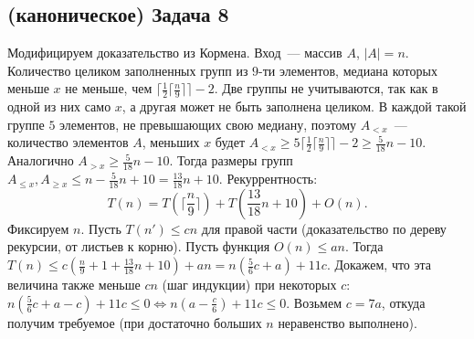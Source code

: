 \documentclass[a4paper]{article}
\begin{document}
\subsection*{(каноническое) Задача 8}
Модифицируем доказательство из Кормена. Вход~--- массив $A$, $|A|=n$. Количество целиком заполненных групп из $9$-ти элементов, медиана которых меньше $x$ не меньше, чем $\lceil \frac{1}{2}\lceil \frac{n}{9}\rceil\rceil-2$. Две группы не учитываются, так как в одной из них само $x$, а другая может не быть заполнена целиком. В каждой такой группе $5$ элементов, не превышающих свою медиану, поэтому $A_{<x}$~--- количество элементов $A$, меньших $x$ будет $A_{<x}\geqslant 5\lceil \frac{1}{2}\lceil \frac{n}{9}\rceil\rceil-2\geqslant\frac{5}{18}n-10$. Аналогично $A_{>x}\geqslant \frac{5}{18}n-10$. Тогда размеры групп $A_{\leqslant x},A_{\geqslant x}\leqslant n-\frac{5}{18}n+10=\frac{13}{18}n+10$. Рекуррентность:
$$
T(n)=T(\lceil\frac{n}{9}\rceil)+T(\frac{13}{18}n+10)+O(n).
$$
Фиксируем $n$. Пусть $T(n')\leqslant cn$ для правой части (доказательство по дереву рекурсии, от листьев к корню). Пусть функция $O(n)\leqslant an$. Тогда $T(n)\leqslant c(\frac{n}{9}+1+\frac{13}{18}n+10)+an=n(\frac{5}{6}c+a)+11c$. Докажем, что эта величина также меньше $cn$ (шаг индукции) при некоторых $c$: $n(\frac{5}{6}c+a-c)+11c\leqslant 0\Leftrightarrow n(a-\frac{c}{6})+11c\leqslant 0$. Возьмем $c=7a$, откуда получим требуемое (при достаточно больших $n$ неравенство выполнено).
\end{document}
